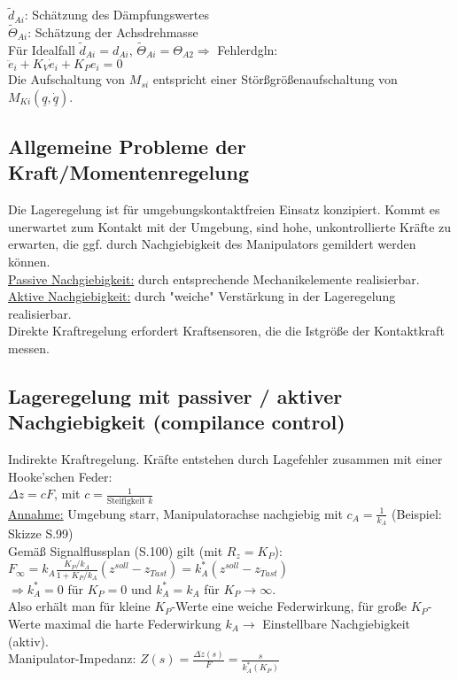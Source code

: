 \documentclass[a4paper,landscape,6pt]{article}
\newcommand{\ul}[1]{\underline{#1}}
\begin{document}
\begin{multicols}{3}
$\tilde d_{Ai}$: Schätzung des Dämpfungswertes\\
$\tilde \Theta_{Ai}$: Schätzung der Achsdrehmasse\\
Für Idealfall $\tilde d_{Ai} = d_{Ai}$, $\tilde \Theta_{Ai} = \Theta_{A2} \Rightarrow$ Fehlerdgln:\\
$\ddot e_i + K_V \dot e_i + K_P e_i = 0$\\

Die Aufschaltung von $M_{si}$ entspricht einer Störßgrößenaufschaltung von $M_{Ki}(\ul q, \dot{\ul q})$.
\subsection*{Allgemeine Probleme der Kraft/Momentenregelung}
Die Lageregelung ist für umgebungskontaktfreien Einsatz konzipiert. Kommt es unerwartet zum Kontakt mit der Umgebung, sind hohe, unkontrollierte Kräfte zu erwarten, die ggf. durch Nachgiebigkeit des Manipulators gemildert werden können.\\
\ul{Passive Nachgiebigkeit:} durch entsprechende Mechanikelemente realisierbar.\\
\ul{Aktive Nachgiebigkeit:} durch "weiche" Verstärkung in der Lageregelung realisierbar.\\
Direkte Kraftregelung erfordert Kraftsensoren, die die Istgröße der Kontaktkraft messen.
\subsection*{Lageregelung mit passiver / aktiver Nachgiebigkeit (compilance control)}
Indirekte Kraftregelung. Kräfte entstehen durch Lagefehler zusammen mit einer Hooke'schen Feder:\\
$\Delta z = c F$, mit $c = \frac{1}{\text{Steifigkeit } k}$\\
\ul{Annahme:} Umgebung starr, Manipulatorachse nachgiebig mit $c_A = \frac{1}{k_A}$ (Beispiel: Skizze S.99)\\
Gemäß Signalflussplan (S.100) gilt (mit $R_z = K_P$):\\
$F_\infty = k_A\frac{K_P/k_A}{1+K_P/k_A}(z^{soll} - z_{Tast}) = k_A^*(z^{soll} - z_{Tast})$\\
$\Rightarrow k_A^* = 0$ für $K_P=0$ und $k_A^* = k_A$ für $K_P \rightarrow \infty$.\\
Also erhält man für kleine $K_P$-Werte eine weiche Federwirkung, für große $K_P$-Werte maximal die harte Federwirkung $k_A \rightarrow $ Einstellbare Nachgiebigkeit (aktiv).\\
Manipulator-Impedanz: $Z(s) =  \frac{\Delta \dot z(s)}{F} = \frac{s}{k_A^*(K_P)}$

\end{multicols}
\end{document}
